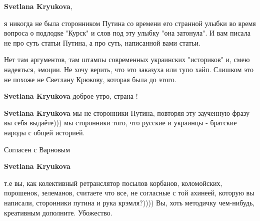 \begin{itemize}
\begin{itemize}
 
\textbf{Svetlana Kryukova}, 

я никогда не была сторонником Путина со времени его странной улыбки во время
вопроса о подлодке "Курск" и слов под эту улыбку "она затонула". И вам писала
не про суть статьи Путина, а про суть, написанной вами статьи. 

Нет там аргументов, там штампы современных украинских "историков" и, смею
надеяться, эмоции. Не хочу верить, что это заказуха или тупо хайп. Слишком это
не похоже не Светлану Крюкову, которая была до этого.

 
\textbf{Svetlana Kryukova} доброе утро, страна !

 
\textbf{Svetlana Kryukova} мы не сторонники Путина, повторяя эту заученную фразу вы себя выдаёте))) мы сторонники того, что русские и украинцы - братские народы с общей историей.

 
Согласен с Варновым

 
\textbf{Svetlana Kryukova} 

т.е вы, как колективный ретранслятор посылов корбанов, коломойских, порошенок,
зелеманов, считаете что все, не согласные с той ахинеей, которую вы написали,
сторонники путина и рука крэмля?)))) Вы, хоть методичку чем-нибудь, креативным
дополните. Убожество.


\end{itemize}
\end{itemize}
